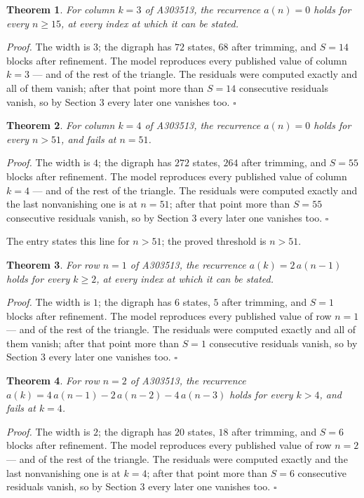 \documentclass[11pt]{article}
\newtheorem{theorem}{Theorem}
\theoremstyle{definition}
\begin{document}
\begin{theorem} For column $k = 3$ of A303513, the recurrence $a(n) = 0$ holds for every $n \ge 15$, at every index at which it can be stated.\end{theorem}

{\itshape Proof.} The width is $3$; the digraph has $72$ states, $68$ after trimming, and $S = 14$ blocks after refinement. The model reproduces every published value of column $k = 3$ --- and of the rest of the triangle. The residuals were computed exactly and all of them vanish; after that point more than $S = 14$ consecutive residuals vanish, so by Section 3 every later one vanishes too. $\square$

\begin{theorem} For column $k = 4$ of A303513, the recurrence $a(n) = 0$ holds for every $n > 51$, and fails at $n = 51$.\end{theorem}

{\itshape Proof.} The width is $4$; the digraph has $272$ states, $264$ after trimming, and $S = 55$ blocks after refinement. The model reproduces every published value of column $k = 4$ --- and of the rest of the triangle. The residuals were computed exactly and the last nonvanishing one is at $n = 51$; after that point more than $S = 55$ consecutive residuals vanish, so by Section 3 every later one vanishes too. $\square$

The entry states this line for $n > 51$; the proved threshold is $n > 51$.

\begin{theorem} For row $n = 1$ of A303513, the recurrence $a(k) = 2\,a(n-1)$ holds for every $k \ge 2$, at every index at which it can be stated.\end{theorem}

{\itshape Proof.} The width is $1$; the digraph has $6$ states, $5$ after trimming, and $S = 1$ blocks after refinement. The model reproduces every published value of row $n = 1$ --- and of the rest of the triangle. The residuals were computed exactly and all of them vanish; after that point more than $S = 1$ consecutive residuals vanish, so by Section 3 every later one vanishes too. $\square$

\begin{theorem} For row $n = 2$ of A303513, the recurrence $a(k) = 4\,a(n-1) - 2\,a(n-2) - 4\,a(n-3)$ holds for every $k > 4$, and fails at $k = 4$.\end{theorem}

{\itshape Proof.} The width is $2$; the digraph has $20$ states, $18$ after trimming, and $S = 6$ blocks after refinement. The model reproduces every published value of row $n = 2$ --- and of the rest of the triangle. The residuals were computed exactly and the last nonvanishing one is at $k = 4$; after that point more than $S = 6$ consecutive residuals vanish, so by Section 3 every later one vanishes too. $\square$
\end{document}
